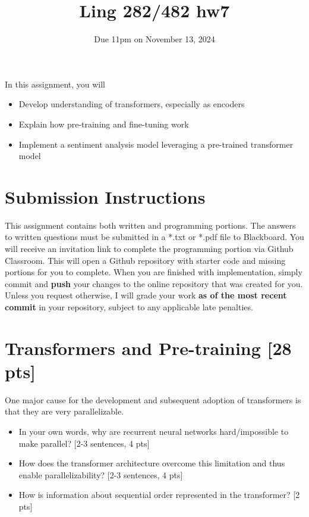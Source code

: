 \documentclass[11pt]{article}
\begin{document}
\title{Ling 282/482 hw7}
\date{\vspace{-0.2in}Due 11pm on November 13, 2024}
\maketitle


\noindent In this assignment, you will 
\begin{itemize}
  \item Develop understanding of transformers, especially as encoders
  \item Explain how pre-training and fine-tuning work
  \item Implement a sentiment analysis model leveraging a pre-trained transformer model
\end{itemize}

\section*{Submission Instructions}
This assignment contains both written and programming portions. The answers to written questions must be submitted in a *.txt or *.pdf file to Blackboard. You will receive an invitation link to complete the programming portion via Github Classroom. This will open a Github repository with starter code and missing portions for you to complete. When you are finished with implementation, simply commit and \textbf{push} your changes to the online repository that was created for you. Unless you request otherwise, I will grade your work \textbf{as of the most recent commit} in your repository, subject to any applicable late penalties.

\section{Transformers and Pre-training [28 pts]}

 One major cause for the development and subsequent adoption of transformers is that they are very parallelizable.
\begin{itemize}
  \item In your own words, why are recurrent neural networks hard/impossible to make parallel? [2-3 sentences, 4 pts]
  \item How does the transformer architecture overcome this limitation and thus enable parallelizability? [2-3 sentences, 4 pts]
  \item How is information about sequential order represented in the transformer? [2 pts]
\end{itemize}
\end{document}
